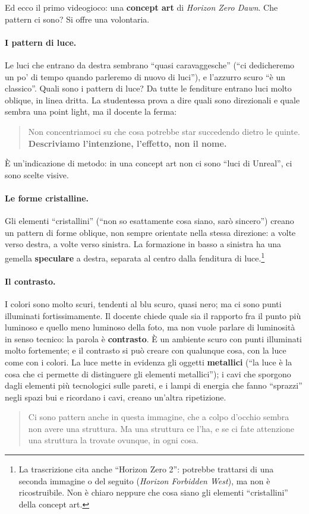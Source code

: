 Ed ecco il primo videogioco: una \textbf{concept art} di \emph{Horizon Zero Dawn}. Che
pattern ci sono? Si offre una volontaria.

\paragraph{I pattern di luce.} Le luci che entrano da destra sembrano ``quasi
caravaggesche'' (``ci dedicheremo un po' di tempo quando parleremo di nuovo di luci''), e
l'azzurro scuro ``è un classico''. Quali sono i pattern di luce? Da tutte le fenditure
entrano luci molto oblique, in linea dritta. La studentessa prova a dire quali sono
direzionali e quale sembra una point light, ma il docente la ferma:
\begin{quote}
Non concentriamoci su che cosa potrebbe star succedendo dietro le quinte.
\textbf{Descriviamo l'intenzione, l'effetto, non il nome.}
\end{quote}
È un'indicazione di metodo: in una concept art non ci sono ``luci di Unreal'', ci sono
scelte visive.

\paragraph{Le forme cristalline.} Gli elementi ``cristallini'' (``non so esattamente cosa
siano, sarò sincero'') creano un pattern di forme oblique, non sempre orientate nella
stessa direzione: a volte verso destra, a volte verso sinistra. La formazione in basso a
sinistra ha una gemella \textbf{speculare} a destra, separata al centro dalla fenditura di
luce.\footnote{La trascrizione cita anche ``Horizon Zero 2'': potrebbe trattarsi di una
seconda immagine o del seguito (\emph{Horizon Forbidden West}), ma non è ricostruibile.
Non è chiaro neppure che cosa siano gli elementi ``cristallini'' della concept art.}

\paragraph{Il contrasto.} I colori sono molto scuri, tendenti al blu scuro, quasi nero; ma
ci sono punti illuminati fortissimamente. Il docente chiede quale sia il rapporto fra il
punto più luminoso e quello meno luminoso della foto, ma non vuole parlare di luminosità
in senso tecnico: la parola è \textbf{contrasto}. È un ambiente scuro con punti illuminati
molto fortemente; e il contrasto si può creare con qualunque cosa, con la luce come con i
colori. La luce mette in evidenza gli oggetti \textbf{metallici} (``la luce è la cosa che
ci permette di distinguere gli elementi metallici''); i cavi che sporgono dagli elementi
più tecnologici sulle pareti, e i lampi di energia che fanno ``sprazzi'' negli spazi bui e
ricordano i cavi, creano un'altra ripetizione.
\begin{quote}
Ci sono pattern anche in questa immagine, che a colpo d'occhio sembra non avere una
struttura. Ma una struttura ce l'ha, e se ci fate attenzione una struttura la trovate
ovunque, in ogni cosa.
\end{quote}

